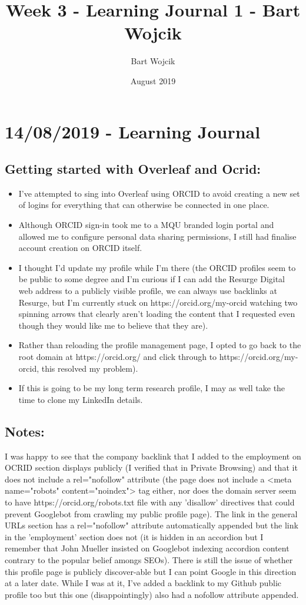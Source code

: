 \documentclass{article}
\title{Week 3 - Learning Journal 1 - Bart Wojcik}
\author{Bart Wojcik}
\date{August 2019}
\begin{document}
\maketitle

\section{14/08/2019 - Learning Journal}
\subsection{Getting started with Overleaf and Ocrid:}
\medskip
\begin{itemize}
    \item I've attempted to sing into Overleaf using ORCID to avoid creating a new set of logins for everything that can otherwise be connected in one place.
    \item Although ORCID sign-in took me to a MQU branded login portal and allowed me to configure personal data sharing permissions, I still had finalise account creation on ORCID itself. 
    \item I thought I'd update my profile while I'm there (the ORCID profiles seem to be public to some degree and I'm curious if I can add the Resurge Digital web address to a publicly visible profile, we can always use backlinks at Resurge, but I'm currently stuck on https://orcid.org/my-orcid watching two spinning arrows that clearly aren't loading the content that I requested even though they would like me to believe that they are). 
    \item Rather than reloading the profile management page, I opted to go back to the root domain at https://orcid.org/ and click through to https://orcid.org/my-orcid, this resolved my problem). 
    \item If this is going to be my long term research profile, I may as well take the time to clone my LinkedIn details. 
\end{itemize}
\subsection{Notes:}
I was happy to see that the company backlink that I added to the employment on OCRID section displays publicly (I verified that in Private Browsing) and that it does not include a rel="nofollow" attribute (the page does not include a <meta name="robots" content="noindex"> tag either, nor does the domain server seem to have https://orcid.org/robots.txt file with any 'disallow' directives that could prevent Googlebot from crawling my public profile page). The link in the general URLs section has a rel="nofollow" attribute automatically appended but the link in the 'employment' section does not (it is hidden in an accordion but I remember that John Mueller insisted on Googlebot indexing accordion content contrary to the popular belief amongs SEOs). There is still the issue of whether this profile page is publicly discover-able but I can point Google in this direction at a later date. While I was at it, I've added a backlink to my Github public profile too but this one (disappointingly) also had a nofollow attribute appended.
\end{document}
